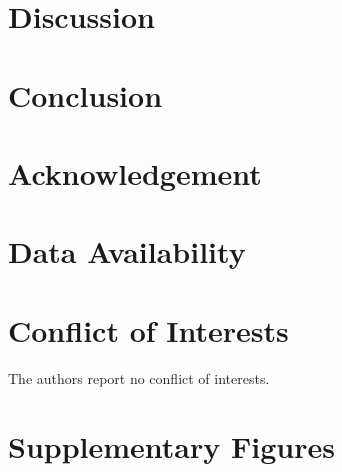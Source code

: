\documentclass[conference,draft]{IEEEtran}
\begin{document}

\section{Discussion}



\section{Conclusion}

\section*{Acknowledgement}

\section*{Data Availability}

\section*{Conflict of Interests}
The authors report no conflict of interests.

\section*{Supplementary Figures}



\end{document}
